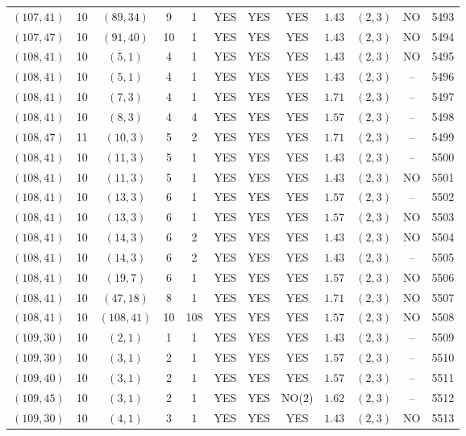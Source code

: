 \begin{longtable}{|c|c|c|c|c|c|c|c|c|c|c|c|}
$(107,41)$ & 10 & $(89,34)$ & 9 & 1 & YES & YES & YES & $1.43$ & $(2,3)$ & NO & 5493\\
$(107,47)$ & 10 & $(91,40)$ & 10 & 1 & YES & YES & YES & $1.43$ & $(2,3)$ & NO & 5494\\
$(108,41)$ & 10 & $(5,1)$ & 4 & 1 & YES & YES & YES & $1.43$ & $(2,3)$ & NO & 5495\\
$(108,41)$ & 10 & $(5,1)$ & 4 & 1 & YES & YES & YES & $1.43$ & $(2,3)$ & -- & 5496\\
$(108,41)$ & 10 & $(7,3)$ & 4 & 1 & YES & YES & YES & $1.71$ & $(2,3)$ & -- & 5497\\
$(108,41)$ & 10 & $(8,3)$ & 4 & 4 & YES & YES & YES & $1.57$ & $(2,3)$ & -- & 5498\\
$(108,47)$ & 11 & $(10,3)$ & 5 & 2 & YES & YES & YES & $1.71$ & $(2,3)$ & -- & 5499\\
$(108,41)$ & 10 & $(11,3)$ & 5 & 1 & YES & YES & YES & $1.43$ & $(2,3)$ & -- & 5500\\
$(108,41)$ & 10 & $(11,3)$ & 5 & 1 & YES & YES & YES & $1.43$ & $(2,3)$ & NO & 5501\\
$(108,41)$ & 10 & $(13,3)$ & 6 & 1 & YES & YES & YES & $1.57$ & $(2,3)$ & -- & 5502\\
$(108,41)$ & 10 & $(13,3)$ & 6 & 1 & YES & YES & YES & $1.57$ & $(2,3)$ & NO & 5503\\
$(108,41)$ & 10 & $(14,3)$ & 6 & 2 & YES & YES & YES & $1.43$ & $(2,3)$ & NO & 5504\\
$(108,41)$ & 10 & $(14,3)$ & 6 & 2 & YES & YES & YES & $1.43$ & $(2,3)$ & -- & 5505\\
$(108,41)$ & 10 & $(19,7)$ & 6 & 1 & YES & YES & YES & $1.57$ & $(2,3)$ & NO & 5506\\
$(108,41)$ & 10 & $(47,18)$ & 8 & 1 & YES & YES & YES & $1.71$ & $(2,3)$ & NO & 5507\\
$(108,41)$ & 10 & $(108,41)$ & 10 & 108 & YES & YES & YES & $1.57$ & $(2,3)$ & NO & 5508\\
$(109,30)$ & 10 & $(2,1)$ & 1 & 1 & YES & YES & YES & $1.43$ & $(2,3)$ & -- & 5509\\
$(109,30)$ & 10 & $(3,1)$ & 2 & 1 & YES & YES & YES & $1.57$ & $(2,3)$ & -- & 5510\\
$(109,40)$ & 10 & $(3,1)$ & 2 & 1 & YES & YES & YES & $1.57$ & $(2,3)$ & -- & 5511\\
$(109,45)$ & 10 & $(3,1)$ & 2 & 1 & YES & YES & NO(2) & $1.62$ & $(2,3)$ & -- & 5512\\
$(109,30)$ & 10 & $(4,1)$ & 3 & 1 & YES & YES & YES & $1.43$ & $(2,3)$ & NO & 5513\\

\end{longtable}
